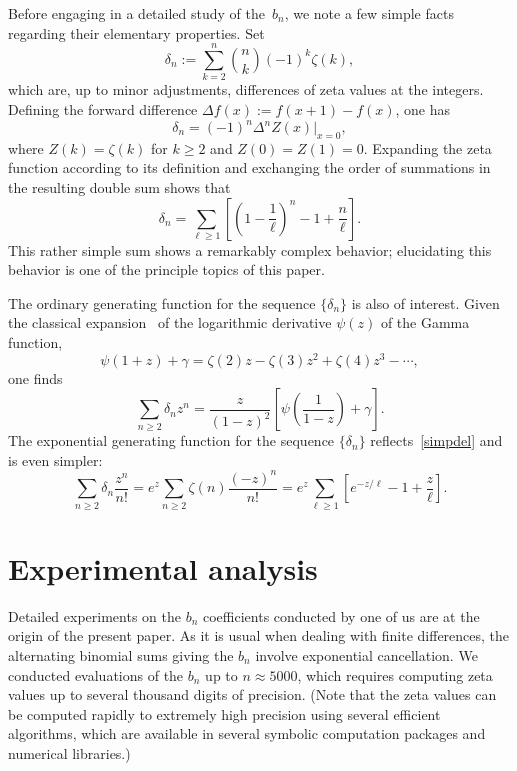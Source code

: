 \documentclass{amsart}
\begin{document}
Before engaging in a detailed study of the~$b_n$, we note a few 
simple facts regarding their elementary properties. Set
\begin{equation}\label{deldef}
\delta_n:=\sum_{k=2}^n \binom{n}{k} (-1)^k \zeta(k),
\end{equation}
which are, up to minor adjustments, differences of zeta values at the
integers.  Defining the forward difference $\Delta f(x):=f(x+1)-f(x)$,
one has
\[
\delta_n= (-1)^n \Delta^n Z(x) \bigg|_{x=0},\]
where $Z(k)=\zeta(k)$ for $k\ge2$ and $Z(0)=Z(1)=0$.
Expanding the zeta function according to its definition and 
exchanging the order of summations in the resulting double sum shows that
\begin{equation}\label{simpdel}
\delta_n = \sum_{\ell\ge1} \left[\left(1-\frac{1}{\ell}\right)^n-1+\frac{n}{\ell}\right].
\end{equation}
This rather simple sum shows a remarkably complex behavior;
elucidating this behavior is one of the principle topics of this paper.


The ordinary generating function for the sequence $\{\delta_n\}$ 
is also of interest.
Given the classical expansion~\cite{WhWa27} 
of the logarithmic derivative $\psi(z)$ of the Gamma function,
\[
\psi(1+z)+\gamma=\zeta(2)z-\zeta(3)z^2+\zeta(4)z^3-\cdots,
\]
one finds
\begin{equation}\label{delogf}
\sum_{n\ge2}\delta_n z^n =\frac{z}{(1-z)^2}\left[\psi\left(\frac{1}{1-z}\right)
+\gamma\right].
\end{equation}
The exponential generating function for the sequence  $\{\delta_n\}$ reflects~\eqref{simpdel} and is even simpler:
\begin{equation}\label{delegf}
\sum_{n\ge2}\delta_n \frac{z^n}{n!}
=e^z\sum_{n\ge2} \zeta(n) \frac{(-z)^n}{n!}=e^z \sum_{\ell\ge1}
\left[e^{-z/\ell}-1+\frac{z}{\ell}\right]
.
\end{equation}


\section{Experimental analysis}

Detailed experiments on the $b_n$ coefficients conducted by one of us are
at the origin of the present paper. As it is usual when dealing with finite differences,
the alternating binomial sums giving the $b_n$ involve exponential
cancellation. We conducted evaluations of the $b_n$ up to $n\approx 5000$,
which requires computing zeta values up to several thousand digits of precision.
(Note that the zeta values can be computed rapidly to extremely high
precision using several efficient algorithms, which are available in several
symbolic computation packages and numerical libraries.)
\end{document}
